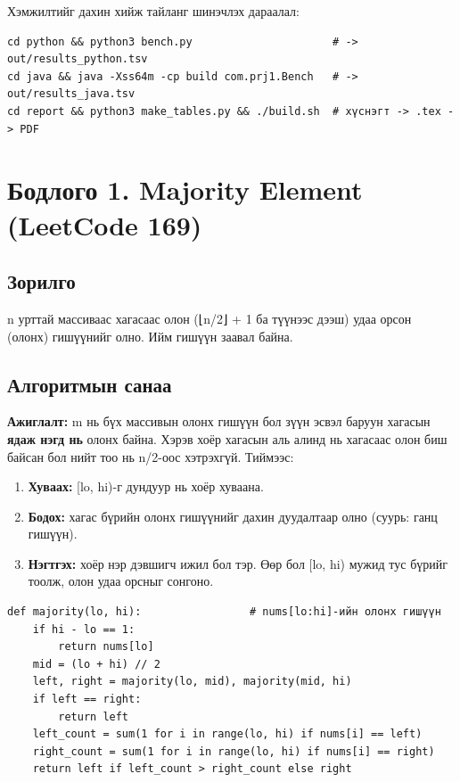 \documentclass[11pt,a4paper]{article}
\begin{document}
Хэмжилтийг дахин хийж тайланг шинэчлэх дараалал:

\begin{Verbatim}
cd python && python3 bench.py                      # -> out/results_python.tsv
cd java && java -Xss64m -cp build com.prj1.Bench   # -> out/results_java.tsv
cd report && python3 make_tables.py && ./build.sh  # хүснэгт -> .tex -> PDF
\end{Verbatim}

\section{Бодлого 1. Majority Element (LeetCode 169)}

\subsection{Зорилго}
n урттай массиваас хагасаас олон (⌊n/2⌋ + 1 ба түүнээс дээш) удаа орсон (олонх) гишүүнийг олно. Ийм гишүүн заавал байна.

\subsection{Алгоритмын санаа}
\textbf{Ажиглалт:} m нь бүх массивын олонх гишүүн бол зүүн эсвэл баруун хагасын \textbf{ядаж нэгд нь} олонх байна. Хэрэв хоёр хагасын аль алинд нь хагасаас олон биш байсан бол нийт тоо нь n/2-оос хэтрэхгүй. Тиймээс:
\begin{enumerate}
\item \textbf{Хуваах:} [lo, hi)-г дундуур нь хоёр хуваана.
\item \textbf{Бодох:} хагас бүрийн олонх гишүүнийг дахин дуудалтаар олно (суурь: ганц гишүүн).
\item \textbf{Нэгтгэх:} хоёр нэр дэвшигч ижил бол тэр. Өөр бол [lo, hi) мужид тус бүрийг тоолж, олон удаа орсныг сонгоно.
\end{enumerate}

\begin{Verbatim}
def majority(lo, hi):                 # nums[lo:hi]-ийн олонх гишүүн
    if hi - lo == 1:
        return nums[lo]
    mid = (lo + hi) // 2
    left, right = majority(lo, mid), majority(mid, hi)
    if left == right:
        return left
    left_count = sum(1 for i in range(lo, hi) if nums[i] == left)
    right_count = sum(1 for i in range(lo, hi) if nums[i] == right)
    return left if left_count > right_count else right
\end{Verbatim}
\end{document}
